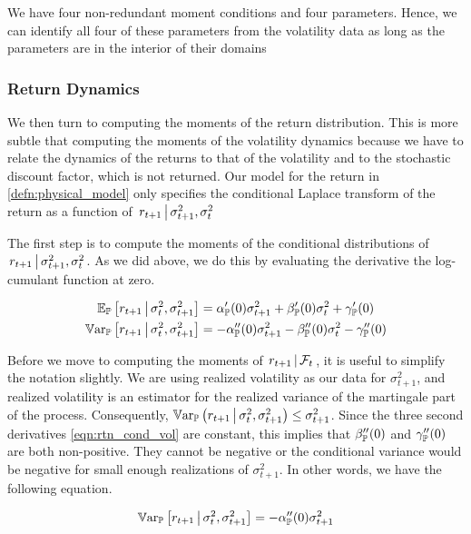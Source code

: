 \documentclass[11pt, letterpaper, twoside, final]{article}
\begin{document}
We have four non-redundant moment conditions and four parameters. 
Hence, we can identify all four of these parameters from the volatility data as long as the parameters are in
the interior of their domains

\subsubsection{Return Dynamics}

We then turn to computing the moments of the return distribution. 
This is more subtle that computing the moments of the volatility dynamics because we have to relate the dynamics
of the returns to that of the volatility and to the stochastic discount factor, which is not returned. 
Our model for the return in \cref{defn:physical_model} only specifies the conditional Laplace transform of the
return as a function of $\left. r_{t+1} \,\middle\vert\, \sigma^2_{t+1}, \sigma^2_t \right.$

The first step is to compute the moments of the conditional distributions of $\left. r_{t+1} \,\middle\vert\,
    \sigma^2_{t+1}, \sigma^2_t \right.$.
As we did above, we do this by evaluating the derivative the log-cumulant function at zero.

\begin{align}
    \operatorname{\mathbb{E}}_{\mathbb{P}}\left[r_{t+1} \,\middle\vert\, \sigma^2_t, \sigma^2_{t+1}\right]  &= \alpha_{\mathbb{P}}'(0) \sigma^2_{t+1}  +
    \beta_{\mathbb{P}}'(0) \sigma^2_t + \gamma_{\mathbb{P}}'(0) \\
    \operatorname{\mathbb{V}ar}_{\mathbb{P}}\left[r_{t+1} \,\middle\vert\, \sigma^2_t, \sigma^2_{t+1}\right]  &= -\alpha_{\mathbb{P}}''(0) \sigma^2_{t+1}  -
    \beta_{\mathbb{P}}''(0) \sigma^2_t - \gamma_{\mathbb{P}}''(0)
    \label{eqn:rtn_cond_vol}
\end{align}


Before we move to computing the moments of $\left. r_{t+1} \,\middle\vert\, \mathcal{F}_t \right.$, it is useful to simplify the
notation slightly.
We are using realized volatility  as our data for $\sigma^2_{t+1}$, and realized volatility is an
estimator for the realized variance of the martingale part of the process.
Consequently, $\operatorname{\mathbb{V}ar}_{\mathbb{P}}\left(r_{t+1} \,\middle\vert\, \sigma^2_t, \sigma^2_{t+1}\right) \leq \sigma^2_{t+1}$.
Since the three second derivatives \cref{eqn:rtn_cond_vol} are constant, this implies that $\beta_{\mathbb{P}}''(0)$ and
$\gamma_{\mathbb{P}}''(0)$ are both non-positive.
They cannot be negative or the conditional variance would be negative for small enough realizations of
$\sigma^2_{t+1}$.
In other words, we have the following equation.

\begin{equation}
    \operatorname{\mathbb{V}ar}_{\mathbb{P}}\left[r_{t+1} \,\middle\vert\, \sigma^2_t, \sigma^2_{t+1}\right]  = -\alpha_{\mathbb{P}}''(0) \sigma^2_{t+1} 
\end{equation}
\end{document}
